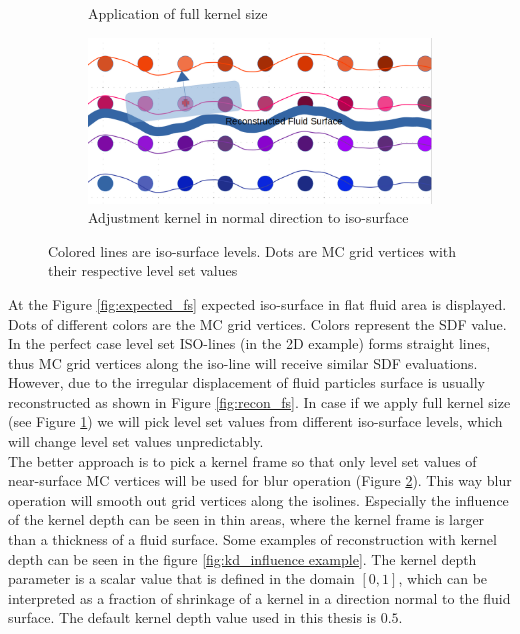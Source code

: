 \begin{figure}[H]
\begin{subfigure}[b]{0.5\textwidth}
               \caption{Application of full kernel size}
               \label{fig:full_ks}
        \end{subfigure}
        \begin{subfigure}[b]{0.5\textwidth}
               \includegraphics[width=\textwidth]{figures/LevelSetBlurKernelPart.png}
               \caption{Adjustment kernel in normal direction to iso-surface}
				\label{fig:partial_ks}
        \end{subfigure}

       \caption{Colored lines are iso-surface levels. Dots are MC grid vertices with their respective level set values}
       \label{fig:kd_surface_explenation}
 \end{figure}
At the Figure \ref{fig:expected_fs} expected iso-surface in flat fluid area is displayed. Dots of different colors are the MC grid vertices. Colors represent the SDF value. In the perfect case level set ISO-lines (in the 2D example) forms straight lines, thus MC grid vertices along the iso-line will receive similar SDF evaluations. However, due to the irregular displacement of fluid particles surface is usually reconstructed as shown in Figure \ref{fig:recon_fs}. In case if we apply full kernel size (see Figure \ref{fig:full_ks}) we will pick level set values from different iso-surface levels, which will change level set values unpredictably.\\
The better approach is to pick a kernel frame so that only level set values of near-surface MC vertices will be used for blur operation (Figure \ref{fig:partial_ks}). This way blur operation will smooth out grid vertices along the isolines. Especially the influence of the kernel depth can be seen in thin areas, where the kernel frame is larger than a thickness of a fluid surface. Some examples of reconstruction with kernel depth can be seen in the figure \ref{fig:kd_influence example}. The kernel depth parameter is a scalar value that is defined in the domain $[0, 1]$, which can be interpreted as a fraction of shrinkage of a kernel in a direction normal to the fluid surface. The default kernel depth value used in this thesis is $0.5$.
